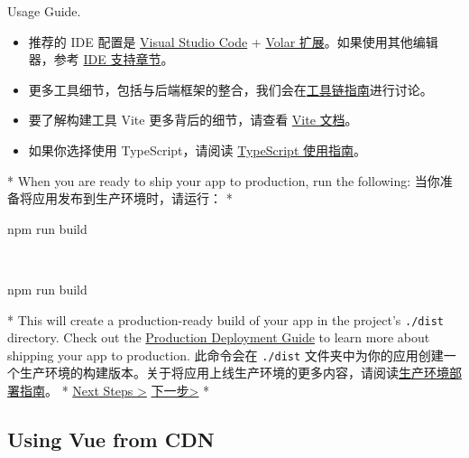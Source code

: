 \begin{paracol}{2}
\begin{itemize}
{      Usage Guide}.
    \end{itemize}
\switchcolumn
\begin{itemize}
    \item
      推荐的 IDE 配置是 \href{https://code.visualstudio.com/}{Visual Studio
      Code} +
      \href{https://marketplace.visualstudio.com/items?itemName=Vue.volar}{Volar
      扩展}。如果使用其他编辑器，参考
      \href{https://cn.vuejs.org/guide/scaling-up/tooling.html\#ide-support}{IDE
      支持章节}。
    \item
      更多工具细节，包括与后端框架的整合，我们会在\href{https://cn.vuejs.org/guide/scaling-up/tooling.html}{工具链指南}进行讨论。
    \item
      要了解构建工具 Vite 更多背后的细节，请查看
      \href{https://cn.vitejs.dev/}{Vite 文档}。
    \item
      如果你选择使用 TypeScript，请阅读
      \href{https://cn.vuejs.org/guide/typescript/overview.html}{TypeScript
      使用指南}。
    \end{itemize}
\switchcolumn[0]*%
When you are ready to ship your app to production, run the following:
\switchcolumn
当你准备将应用发布到生产环境时，请运行：
\switchcolumn[0]*%
~\begin{codeShellMul}
npm run build
\end{codeShellMul}
\switchcolumn
~\begin{codeShellMul}
npm run build
\end{codeShellMul}
\switchcolumn[0]*%
This will create a production-ready build of your app in the project's
\texttt{./dist} directory. Check out the
\href{https://vuejs.org/guide/best-practices/production-deployment.html}{Production
Deployment Guide} to learn more about shipping your app to production.
\switchcolumn
此命令会在 \texttt{./dist}
文件夹中为你的应用创建一个生产环境的构建版本。关于将应用上线生产环境的更多内容，请阅读\href{https://cn.vuejs.org/guide/best-practices/production-deployment.html}{生产环境部署指南}。
\switchcolumn[0]*%
\href{https://vuejs.org/guide/quick-start.html\#next-steps}{Next Steps
\textgreater{}}
\switchcolumn
\href{https://cn.vuejs.org/guide/quick-start.html\#next-steps}{下一步\textgreater{}}
\switchcolumn[0]*%
\subsection{Using Vue from CDN}
\switchcolumn

\end{paracol}
